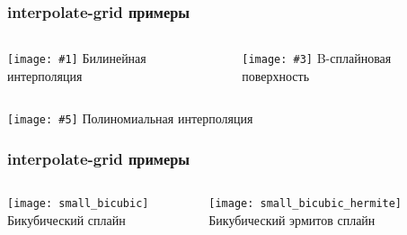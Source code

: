 \documentclass[rpussian]{beamer}
\newcommand\imagesthree[6]{
  \begin{columns}[b]
    \begin{column}{.5\textwidth}
      \begin{center}
        \texttt{[image: \#1]}
        \newline
        \scriptsize #2
      \end{center}
    \end{column}
    \begin{column}{.5\textwidth}
      \begin{center}
      \texttt{[image: \#3]}
      \newline
      \scriptsize #4
      \end{center}
    \end{column}
  \end{columns}
  \begin{center}
    \hspace*{1.2cm} \texttt{[image: \#5]}
    \newline
    \scriptsize #6
  \end{center}
}
\begin{document}
\begin{frame}
  \frametitle{interpolate-grid примеры}
  \imagesthree
  {small_bilinear}{Билинейная интерполяция}
  {small_b_surface}{B-сплайновая поверхность}
  {small_polynomial}{Полиномиальная интерполяция}
\end{frame}

\begin{frame}
  \frametitle{interpolate-grid примеры}
    \begin{columns}[c]
    \begin{column}{.5\textwidth}
      \begin{center}
        \texttt{[image: small\_bicubic]}
        \newline
        \scriptsize Бикубический сплайн
      \end{center}
    \end{column}
    \begin{column}{.5\textwidth}
      \begin{center}
      \texttt{[image: small\_bicubic\_hermite]}
      \newline
      \scriptsize Бикубический эрмитов сплайн
      \end{center}
    \end{column}
  \end{columns}
\end{frame}
\end{document}
